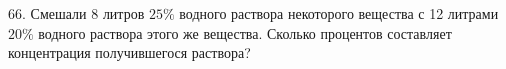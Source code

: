 66. Смешали 8 литров $25\%$ водного раствора некоторого вещества с 12 литрами $20\%$ водного раствора этого же вещества. Сколько процентов составляет концентрация получившегося раствора?\\
